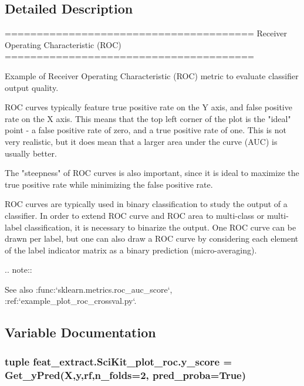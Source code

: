\subsection{Detailed Description}
\begin{DoxyVerb}=======================================
Receiver Operating Characteristic (ROC)
=======================================

Example of Receiver Operating Characteristic (ROC) metric to evaluate
classifier output quality.

ROC curves typically feature true positive rate on the Y axis, and false
positive rate on the X axis. This means that the top left corner of the plot is
the "ideal" point - a false positive rate of zero, and a true positive rate of
one. This is not very realistic, but it does mean that a larger area under the
curve (AUC) is usually better.

The "steepness" of ROC curves is also important, since it is ideal to maximize
the true positive rate while minimizing the false positive rate.

ROC curves are typically used in binary classification to study the output of
a classifier. In order to extend ROC curve and ROC area to multi-class
or multi-label classification, it is necessary to binarize the output. One ROC
curve can be drawn per label, but one can also draw a ROC curve by considering
each element of the label indicator matrix as a binary prediction
(micro-averaging).

.. note::

    See also :func:`sklearn.metrics.roc_auc_score`,
     :ref:`example_plot_roc_crossval.py`.\end{DoxyVerb}
 

\subsection{Variable Documentation}
\hypertarget{namespacefeat__extract_1_1_sci_kit__plot__roc_a98d01a02754219127aef4d005b5a6792}{}
\subsubsection[{y\+\_\+score}]{\setlength{\rightskip}{0pt plus 5cm}tuple feat\+\_\+extract.\+Sci\+Kit\+\_\+plot\+\_\+roc.\+y\+\_\+score = Get\+\_\+y\+Pred(X,y,{\bf rf},n\+\_\+folds=2, pred\+\_\+proba=True)}\label{namespacefeat__extract_1_1_sci_kit__plot__roc_a98d01a02754219127aef4d005b5a6792}


